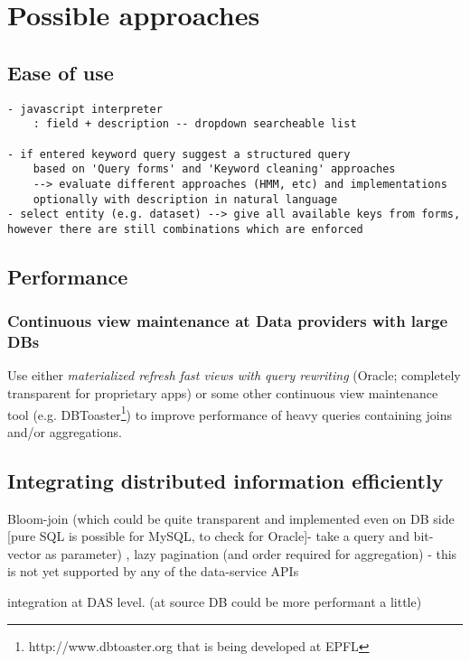 \documentclass[a4paper,11pt,draft]{article}
\begin{document}
\section{Possible approaches}


\subsection{Ease of use}
\begin{verbatim}
- javascript interpreter
    : field + description -- dropdown searcheable list
    
- if entered keyword query suggest a structured query
	based on 'Query forms' and 'Keyword cleaning' approaches
	--> evaluate different approaches (HMM, etc) and implementations
	optionally with description in natural language
- select entity (e.g. dataset) --> give all available keys from forms, however there are still combinations which are enforced
\end{verbatim}

\subsection{Performance}
\subsubsection{Continuous view maintenance at Data providers with large DBs}
Use either \textit{materialized refresh fast views with query rewriting} (Oracle; completely transparent for proprietary apps)\cite{Oracle11}
 or some other continuous view maintenance tool (e.g. DBToaster\footnote{http://www.dbtoaster.org that is being developed at EPFL}) to improve performance of heavy queries containing joins and/or aggregations.

\subsection{Integrating distributed information efficiently}
Bloom-join (which could be quite transparent and implemented even on DB side [pure SQL is possible for MySQL, to check for Oracle]- take a query and bit-vector as parameter) , lazy pagination (and order required for aggregation) - this is not yet supported by any of the data-service APIs

integration at DAS level. (at source DB could be more performant a little)
\end{document}
